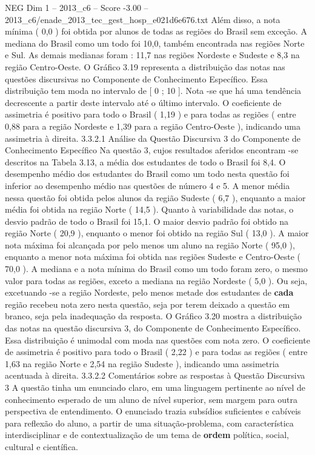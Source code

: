 \begin{textsample}{NEG Dim 1 – 2013\_c6 – Score -3.00 – 2013\_c6/enade\_2013\_tec\_gest\_hosp\_e021d6e676.txt}
Além disso, a nota mínima ( 0,0 ) foi obtida por alunos de todas as regiões do Brasil sem exceção.
A mediana do Brasil como um todo foi 10,0, também encontrada nas regiões Norte e Sul.
As demais medianas foram : 11,7 nas regiões Nordeste e Sudeste e 8,3 na região Centro-Oeste.
O Gráfico 3.19 representa a distribuição das notas nas questões discursivas no Componente de Conhecimento Específico.
Essa distribuição tem moda no intervalo de [ 0 ; 10 ].
Nota -se que há uma tendência decrescente a partir deste intervalo até o último intervalo.
O coeficiente de assimetria é positivo para todo o Brasil ( 1,19 ) e para todas as regiões ( entre 0,88 para a região Nordeste e 1,39 para a região Centro-Oeste ), indicando uma assimetria à direita. 3.3.2.1 Análise da Questão Discursiva 3 do Componente de Conhecimento Específico Na questão 3, cujos resultados aferidos encontram -se descritos na Tabela 3.13, a média dos estudantes de todo o Brasil foi 8,4.
O desempenho médio dos estudantes do Brasil como um todo nesta questão foi inferior ao desempenho médio nas questões de número 4 e 5.
A menor média nessa questão foi obtida pelos alunos da região Sudeste ( 6,7 ), enquanto a maior média foi obtida na região Norte ( 14,5 ).
Quanto à variabilidade das notas, o desvio padrão de todo o Brasil foi 15,1.
O maior desvio padrão foi obtido na região Norte ( 20,9 ), enquanto o menor foi obtido na região Sul ( 13,0 ).
A maior nota máxima foi alcançada por pelo menos um aluno na região Norte ( 95,0 ), enquanto a menor nota máxima foi obtida nas regiões Sudeste e Centro-Oeste ( 70,0 ).
A mediana e a nota mínima do Brasil como um todo foram zero, o mesmo valor para todas as regiões, exceto a mediana na região Nordeste ( 5,0 ).
Ou seja, excetuando -se a região Nordeste, pelo menos metade dos estudantes de \textbf{cada} região recebeu nota zero nesta questão, seja por terem deixado a questão em branco, seja pela inadequação da resposta.
O Gráfico 3.20 mostra a distribuição das notas na questão discursiva 3, do Componente de Conhecimento Específico.
Essa distribuição é unimodal com moda nas questões com nota zero.
O coeficiente de assimetria é positivo para todo o Brasil ( 2,22 ) e para todas as regiões ( entre 1,63 na região Norte e 2,54 na região Sudeste ), indicando uma assimetria acentuada à direita. 3.3.2.2 Comentários sobre as respostas à Questão Discursiva 3 A questão tinha um enunciado claro, em uma linguagem pertinente ao nível de conhecimento esperado de um aluno de nível superior, sem margem para outra perspectiva de entendimento.
O enunciado trazia subsídios suficientes e cabíveis para reflexão do aluno, a partir de uma situação-problema, com característica interdisciplinar e de contextualização de um tema de \textbf{ordem} política, social, cultural e científica.

\end{textsample}
